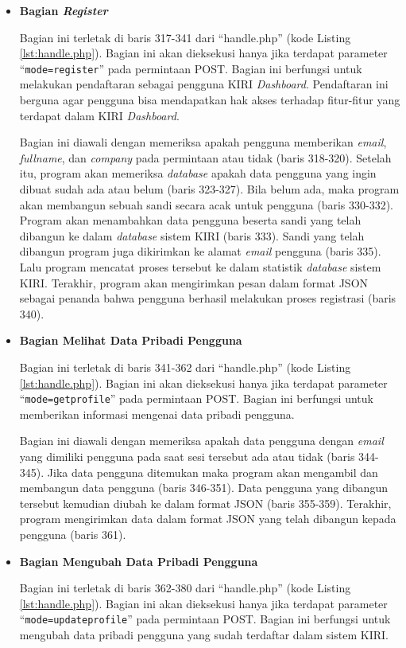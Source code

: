 \documentclass[a4paper,twoside]{article}
\begin{document}
\begin{enumerate}
\begin{itemize}
\item \textbf{Bagian \textit{Register}}

Bagian ini terletak di baris 317-341 dari ``handle.php'' (kode Listing \ref{lst:handle.php}). Bagian ini akan dieksekusi hanya jika terdapat parameter ``\texttt{mode=register}'' pada permintaan POST. Bagian ini berfungsi untuk melakukan pendaftaran sebagai pengguna KIRI \textit{Dashboard}. Pendaftaran ini berguna agar pengguna bisa mendapatkan hak akses terhadap fitur-fitur yang terdapat dalam KIRI \textit{Dashboard}.

Bagian ini diawali dengan memeriksa apakah pengguna memberikan \textit{email}, \textit{fullname}, dan \textit{company} pada permintaan atau tidak (baris 318-320). Setelah itu, program akan memeriksa \textit{database} apakah data pengguna yang ingin dibuat sudah ada atau belum (baris 323-327). Bila belum ada, maka program akan membangun sebuah sandi secara acak untuk pengguna (baris 330-332). Program akan menambahkan data pengguna beserta sandi yang telah dibangun ke dalam \textit{database} sistem KIRI (baris 333). Sandi yang telah dibangun program juga dikirimkan ke alamat \textit{email} pengguna (baris 335). Lalu program mencatat proses tersebut ke dalam statistik \textit{database} sistem KIRI. Terakhir, program akan mengirimkan pesan dalam format JSON sebagai penanda bahwa pengguna berhasil melakukan proses registrasi (baris 340).

\item \textbf{Bagian Melihat Data Pribadi Pengguna}

Bagian ini terletak di baris 341-362 dari ``handle.php'' (kode Listing \ref{lst:handle.php}). Bagian ini akan dieksekusi hanya jika terdapat parameter ``\texttt{mode=getprofile}'' pada permintaan POST. Bagian ini berfungsi untuk memberikan informasi mengenai data pribadi pengguna.

Bagian ini diawali dengan memeriksa apakah data pengguna dengan \textit{email} yang dimiliki pengguna pada saat sesi tersebut ada atau tidak (baris 344-345). Jika data pengguna ditemukan maka program akan mengambil dan membangun data pengguna (baris 346-351). Data pengguna yang dibangun tersebut kemudian diubah ke dalam format JSON (baris 355-359). Terakhir, program mengirimkan data dalam format JSON yang telah dibangun kepada pengguna (baris 361).

\item \textbf{Bagian Mengubah Data Pribadi Pengguna}

Bagian ini terletak di baris 362-380 dari ``handle.php'' (kode Listing \ref{lst:handle.php}). Bagian ini akan dieksekusi hanya jika terdapat parameter ``\texttt{mode=updateprofile}'' pada permintaan POST. Bagian ini berfungsi untuk mengubah data pribadi pengguna yang sudah terdaftar dalam sistem KIRI.


\end{itemize}
\end{enumerate}
\end{document}
